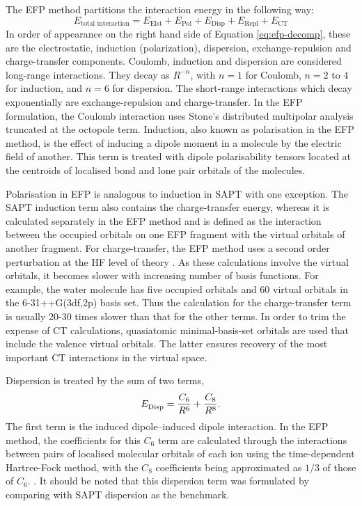 The EFP method partitions the interaction energy in the following way:
\begin{equation}
    \label{eq:efp-decomp}
    E_{\text{total interaction}} = E_{\text{Elst}} + E_{\text{Pol}} + E_{\text{Disp}} + 
                                    E_{\text{Repl}} + E_{\text{CT}}
\end{equation}
In order of appearance on the right hand side of Equation \ref{eq:efp-decomp}, these are the electrostatic, induction (polarization), dispersion, exchange-repulsion and charge-transfer components.
Coulomb, induction and dispersion are considered long-range interactions.
They decay as $R^{-n}$, with $n = 1$ for Coulomb, $n = 2$ to 4 for induction, and $n = 6$ for dispersion.
The short-range interactions which decay exponentially are exchange-repulsion and charge-transfer.
In the EFP formulation, the Coulomb interaction uses Stone's distributed multipolar analysis 
\cite{Stone1996a} truncated at the octopole term.
Induction, also known as polarisation in the EFP method, is the effect of inducing a dipole moment in a molecule by the electric field of another.
This term is treated with dipole polarisability tensors located at the centroids of localised bond and lone pair orbitals of the molecules.
\cite{Li2006a}


Polarisation in EFP is analogous to induction in SAPT with one exception. 
The SAPT induction term also contains the charge-transfer energy, whereas it is calculated separately in the EFP method and is defined as the interaction between the occupied orbitals on one EFP fragment with the virtual orbitals of another fragment. 
For charge-transfer, the EFP method uses a second order perturbation at the HF level of theory
\cite{Li2006a}.
As these calculations involve the virtual orbitals, it becomes slower with increasing number of basis functions. 
For example, the water molecule has five occupied orbitals and 60 virtual orbitals in the 6-31++G(3df,2p) basis set. 
Thus the calculation for the charge-transfer term is usually 20-30 times slower than that for the other terms.
\cite{Li2006a}
In order to trim the expense of CT calculations, quasiatomic minimal-basis-set orbitals 
\cite{Lu2004a} 
are used that include the valence virtual orbitals. The latter ensures recovery of the most important CT interactions in the virtual space.


Dispersion is treated by the sum of two terms,
\begin{equation}
     E^{\text{}}_{\text{Disp}}  = \frac{C_6}{R^6} + \frac{C_8}{R^8}.
\end{equation}
The first term is the induced dipole--induced dipole interaction.
In the EFP method, the coefficients for this $C_6$ term are calculated through the interactions between pairs of localised molecular orbitals of each ion using the time-dependent Hartree-Fock method, with the $C_8$ coefficients being approximated as $1/3$ of those of $C_6$.
\cite{Adamovic2005a}.
It should be noted that this dispersion term was formulated by comparing with SAPT dispersion as the benchmark.


